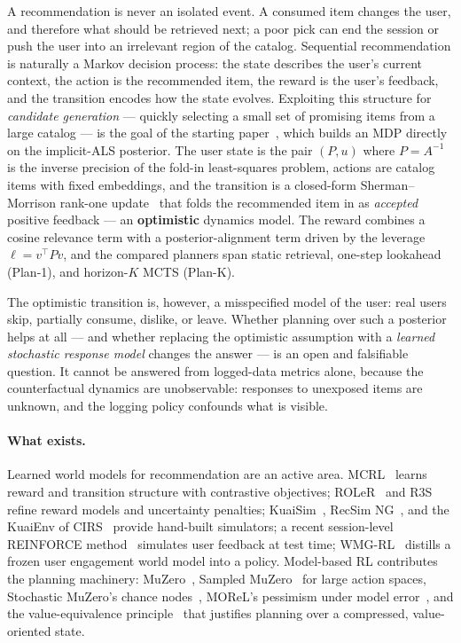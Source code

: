 \documentclass[11pt,a4paper]{article}
\begin{document}
A recommendation is never an isolated event. A consumed item changes the user, and
therefore what should be retrieved next; a poor pick can end the session or push the
user into an irrelevant region of the catalog. Sequential recommendation is naturally a
Markov decision process: the state describes the user's current context, the action is
the recommended item, the reward is the user's feedback, and the transition encodes how
the state evolves. Exploiting this structure for \emph{candidate generation} --- quickly
selecting a small set of promising items from a large catalog --- is the goal of the
starting paper~\cite{trapeznikov2026mfmdp}, which builds an MDP directly on the
implicit-ALS posterior. The user state is the pair $(P, u)$ where $P = A^{-1}$ is the
inverse precision of the fold-in least-squares problem, actions are catalog items with
fixed embeddings, and the transition is a closed-form Sherman--Morrison rank-one
update~\cite{sherman1950morrison} that folds the recommended item in as \emph{accepted}
positive feedback --- an \textbf{optimistic} dynamics model. The reward combines a
cosine relevance term with a posterior-alignment term driven by the leverage
$\ell = v^{\top} P v$, and the compared planners span static retrieval, one-step
lookahead (Plan-1), and horizon-$K$ MCTS (Plan-K).

The optimistic transition is, however, a misspecified model of the user: real users
skip, partially consume, dislike, or leave. Whether planning over such a posterior helps
at all --- and whether replacing the optimistic assumption with a \emph{learned
stochastic response model} changes the answer --- is an open and falsifiable question.
It cannot be answered from logged-data metrics alone, because the counterfactual
dynamics are unobservable: responses to unexposed items are unknown, and the logging
policy confounds what is visible.

\paragraph{What exists.}
Learned world models for recommendation are an active area. MCRL~\cite{li2023mcrl}
learns reward and transition structure with contrastive objectives; ROLeR~\cite{zhang2024roler}
and R3S~\cite{shu2025r3s} refine reward models and uncertainty penalties; KuaiSim~\cite{zhao2023kuaisim},
RecSim NG~\cite{hsu2021recsimng}, and the KuaiEnv of CIRS~\cite{gao2023cirs} provide
hand-built simulators; a recent session-level REINFORCE method~\cite{matveev2026sessionreinforce}
simulates user feedback at test time; WMG-RL~\cite{li2026wmg} distills a frozen user
engagement world model into a policy. Model-based RL contributes the planning machinery:
MuZero~\cite{schrittwieser2020muzero}, Sampled MuZero~\cite{hubert2021sampledmuzero} for
large action spaces, Stochastic MuZero's chance nodes~\cite{antonoglou2022stochasticmuzero},
MOReL's pessimism under model error~\cite{kidambi2020morel}, and the value-equivalence
principle~\cite{grimm2021valueequivalence} that justifies planning over a compressed,
value-oriented state.
\end{document}
